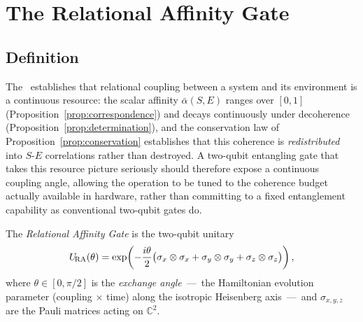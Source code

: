 
\section{The Relational Affinity Gate}
\label{sec:gate}

\subsection{Definition}

The \RCT~establishes that relational coupling between a system and its
environment is a continuous resource: the scalar affinity
$\bar\alpha(S,E)$ ranges over $[0,1]$ (Proposition~\ref{prop:correspondence})
and decays continuously under decoherence
(Proposition~\ref{prop:determination}), and the conservation law of
Proposition~\ref{prop:conservation} establishes that this coherence is
\emph{redistributed} into $S$-$E$ correlations rather than destroyed.
A two-qubit entangling gate that takes this resource picture seriously
should therefore expose a continuous coupling angle, allowing the
operation to be tuned to the coherence budget actually available in
hardware, rather than committing to a fixed entanglement capability as
conventional two-qubit gates do.

\begin{definition}
The \emph{Relational Affinity Gate} is the two-qubit unitary
\begin{equation}
  U_{\!\mathrm{RA}}(\theta) = \exp\!\left(-\frac{i\theta}{2}
    \bigl(\sigma_x \otimes \sigma_x
         + \sigma_y \otimes \sigma_y
         + \sigma_z \otimes \sigma_z\bigr)\right),
  \label{eq:URA}
\end{equation}
where $\theta \in [0, \pi/2]$ is the \emph{exchange angle}~---~the
Hamiltonian evolution parameter (coupling$\,\times\,$time) along the
isotropic Heisenberg axis~---~and $\sigma_{x,y,z}$ are the Pauli matrices
acting on $\mathbb{C}^2$.
\end{definition}

